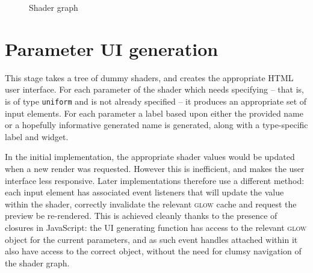 \documentclass[12pt,twoside,notitlepage]{report}
\begin{document}
\begin{figure}

\caption{Shader graph\label{pipe-graph}}
\end{figure}

\section{Parameter UI generation}
\label{ui-params}
This stage takes a tree of dummy shaders, and creates the appropriate HTML user interface. For each parameter of the shader which needs specifying -- that is, is of type {\tt uniform} and is not already specified -- it produces an appropriate set of input elements. For each parameter a label based upon either the provided name or a hopefully informative generated name is generated, along with a type-specific label and widget.

In the initial implementation, the appropriate shader values would be updated when a new render was requested. However this is inefficient, and makes the user interface less responsive. Later implementations therefore use a different method: each input element has associated event listeners that will update the value within the shader, correctly invalidate the relevant \textsc{glow} cache and request the preview be re-rendered. This is achieved cleanly thanks to the presence of closures in JavaScript: the UI generating function has access to the relevant \textsc{glow} object for the current parameters, and as such event handles attached within it also have access to the correct object, without the need for clumsy navigation of the shader graph. 
\end{document}
